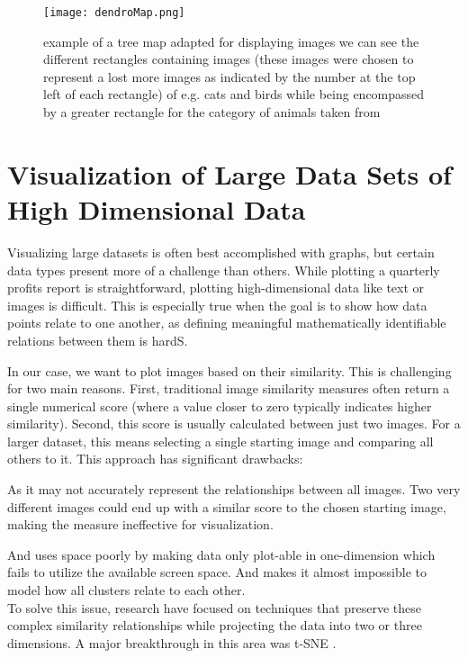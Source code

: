 \documentclass[
  a4paper,  %
  twoside,  %
  bibliography=totoc,
  headsepline,
  cleardoublepage=empty,
  parskip=half,
  draft=false
]{scrbook}
\begin{document}
  \begin{figure}[H]
	\centering
	\texttt{[image: dendroMap.png]}
	\caption{example of a tree map adapted for displaying images we can see the different rectangles containing images (these images were chosen to represent a lost more images as indicated by the number at the top left of each rectangle) of e.g. cats and birds while being encompassed by a greater rectangle for the category of animals taken from \cite{wordclouds}}
	\label{fig:dendroMap}
\end{figure}




\section{Visualization of Large Data Sets of High Dimensional Data}
\label{sec:HighData}
Visualizing large datasets is often best accomplished with graphs, but certain data types present more of a challenge than others. While plotting a quarterly profits report is straightforward, plotting high-dimensional data like text or images is difficult. This is especially true when the goal is to show how data points relate to one another, as defining meaningful mathematically identifiable relations between them is hardS.

In our case, we want to plot images based on their similarity. This is challenging for two main reasons. First, traditional image similarity measures often return a single numerical score (where a value closer to zero typically indicates higher similarity). Second, this score is usually calculated between just two images. For a larger dataset, this means selecting a single starting image and comparing all others to it. This approach has significant drawbacks:

As it  may not accurately represent the relationships between all images. Two very different images could end up with a similar score to the chosen starting image, making the measure ineffective for visualization.
	
	And uses space poorly by making data only plot-able in one-dimension which fails to utilize the available screen space. And makes it almost impossible to model how all clusters relate to each other.\\
To solve this issue, research have focused on techniques that preserve these complex similarity relationships while projecting the data into two or three dimensions. A major breakthrough in this area was t-SNE \cite{van2008visualizing}.
\end{document}
